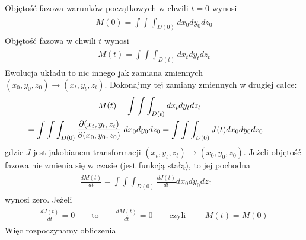 \documentclass[a4paper,12pt,polish]{sphinxmanual}
\begin{document}
Objętość fazowa warunków początkowych w chwili $t=0$ wynosi
\label{ch1/chI022:equation-eqn23}\begin{gather}
\begin{split}M(0) = \int \int \int_{D(0)}  dx_0 dy_0 dz_0\end{split}\label{ch1/chI022-eqn23}
\end{gather}
Objętość fazowa w chwili $t$ wynosi
\label{ch1/chI022:equation-eqn24}\begin{gather}
\begin{split}M(t) = \int \int \int_{D(t)}  dx_t dy_t dz_t\end{split}\label{ch1/chI022-eqn24}
\end{gather}
Ewolucja układu to nic innego jak zamiana zmiennych $(x_0, y_0, z_0) \to (x_t, y_t, z_t)$. Dokonajmy tej zamiany zmiennych w drugiej całce:
\label{ch1/chI022:equation-eqn25}\begin{gather}
\begin{split}M(t) = \int \int \int_{D(t)}  dx_t dy_t dz_t  =\end{split}\label{ch1/chI022-eqn25}\\\begin{split}=  \int \int \int_{D(0)}  \frac{\partial (x_t, y_t, z_t)}{\partial (x_0, y_0, z_0)} \; dx_0 dy_0 dz_0  = \int \int \int_{D(0)}   J(t)  dx_0 dy_0 dz_0 \qquad\end{split}\notag
\end{gather}
gdzie $J$ jest jakobianem transformacji  $(x_t, y_t, z_t) \to (x_0, y_0, z_0)$. Jeżeli objętość fazowa nie zmienia się w czasie (jest funkcją stałą), to jej pochodna
\label{ch1/chI022:equation-eqn26}\begin{gather}
\begin{split}\frac{dM(t)}{dt} = \int \int \int_{D(0)}  \frac{ dJ(t)}{dt}  dx_0 dy_0 dz_0  \qquad\end{split}\label{ch1/chI022-eqn26}
\end{gather}
wynosi zero. Jeżeli
\label{ch1/chI022:equation-eqn27}\begin{gather}
\begin{split} \frac{ dJ(t)}{dt} = 0  \qquad \mbox{to} \qquad \frac{dM(t)}{dt} = 0 \qquad \mbox{czyli } \qquad M(t)=M(0)\end{split}\label{ch1/chI022-eqn27}
\end{gather}
Więc rozpoczynamy obliczenia
\end{document}
